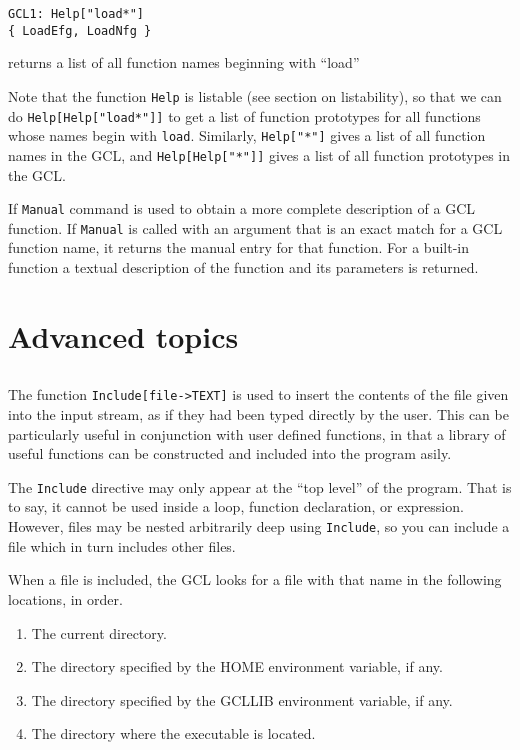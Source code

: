 \begin{verbatim}
GCL1: Help["load*"]
{ LoadEfg, LoadNfg }
\end{verbatim}

\noindent
returns a list of all function names beginning with ``load''

Note that the function \verb+Help+ is listable (see section on
listability), so that we can do \verb+Help[Help["load*"]]+ to get a
list of function prototypes for all functions whose names begin with
\verb+load+.  Similarly, \verb+Help["*"]+ gives a list of all function
names in the GCL, and \verb+Help[Help["*"]]+ gives a list of all
function prototypes in the GCL.

If \verb+Manual+ command is used to obtain a more complete description
of a GCL function.  If \verb+Manual+ is called with an argument that
is an exact match for a GCL function name, it returns the manual entry
for that function.  For a built-in function a textual description of
the function and its parameters is returned. 

\chapter{Advanced topics}

\section{}

The function \verb+Include[file->TEXT]+ is used to
insert the contents of the file given into the input stream, as if
they had been typed directly by the user.  This can be particularly
useful in conjunction with user defined functions, in that a library
of useful functions can be constructed and included into the program
asily.

The \verb+Include+ directive may only appear at the ``top level'' of
the program.  That is to say, it cannot be used inside a loop,
function declaration, or expression.  However, files may be nested
arbitrarily deep using {\tt Include}, so you can include a file which
in turn includes other files.
  
When a file is included, the GCL looks for a file with that name in
the following locations, in order.  
\begin{enumerate}
\item The current directory.
\item The directory specified by the HOME environment variable, if any.
\item The directory specified by the GCLLIB environment variable, if any.
\item The directory where the executable is located.
\end{enumerate}


